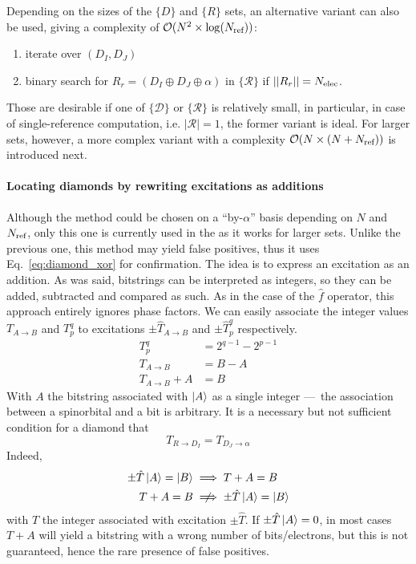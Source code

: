 \documentclass[./thesis.tex]{subfiles}
\begin{document}
Depending on the sizes of the $\{D\}$ and $\{R\}$ sets, an alternative variant can also be used, giving a complexity of $\mathcal{O}(N^2 \times \log({N_\text{ref}}))$:
\begin{enumerate}
\item
iterate over $(D_I, D_J)$
\item
binary search for $R_r = (D_I \oplus D_J \oplus \alpha)$ in $\{\mathcal{R}\}$ if $||R_r|| = {N_\text{elec}}$.
\end{enumerate}

Those are desirable if one of $\{\mathcal{D}\}$ or $\{\mathcal{R}\}$ is relatively small, in particular, in case of single-reference computation, i.e. $|\mathcal{R}|=1$, the former variant is ideal. For larger sets, however, a more complex variant with a complexity $\mathcal{O}(N \times (N+{N_\text{ref}}))$ is introduced next.


\paragraph{Locating diamonds by rewriting excitations as additions}
Although the method could be chosen on a ``by-$\alpha$'' basis depending on $N$ and ${N_\text{ref}}$, only this one is currently used in the \QP as it works for larger sets.
Unlike the previous one, this method may yield false positives, thus it uses Eq.~\eqref{eq:diamond_xor} for confirmation.
The idea is to express an excitation as an addition. As was said, bitstrings can be interpreted as integers, so they can be added, subtracted and compared as such. As in the case of the $\hat f$ operator, this approach entirely ignores phase factors. We can easily associate the integer values $T_{A \rightarrow B}$ and $T_p^q$ to excitations $\pm \hat T_{A \rightarrow B}$ and $\pm \hat T_p^q$ respectively.
\begin{align}
T_p^q & = 2^{q-1} - 2^{p-1} \\
T_{A \rightarrow B} & =  B - A \\
T_{A \rightarrow B} + A & = B 
\end{align}
With $A$ the bitstring associated with $\ket A$ as a single integer ---~the association between a spinorbital and a bit is arbitrary. It is a necessary but not sufficient condition for a diamond that
\begin{equation}
T_{R \rightarrow D_I} = T_{D_J \rightarrow \alpha}
\end{equation}
Indeed,
\begin{align}
\pm \hat T \ket A = \ket B & \implies  T + A = B\\
T + A = B & \centernot \implies \pm \hat T \ket A = \ket B
\end{align}
with $T$ the integer associated with excitation $\pm \hat T$. If $\pm \hat T \ket A = 0$, in most cases $T + A$ will yield a bitstring with a wrong number of bits/electrons, but this is not guaranteed, hence the rare presence of false positives.
\end{document}
